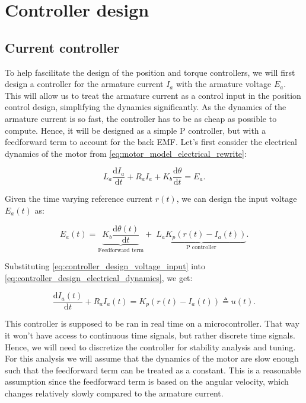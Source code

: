 \chapter{Controller design}%
\label{ch:controller_design}

\section{Current controller}

To help fascilitate the design of the position and torque controllers, we will first design a controller for the armature current $I_a$ with the armature voltage $E_a$. This will allow us to treat the armature current as a control input in the position control design, simplifying the dynamics significantly. As the dynamics of the armature current is so fast, the controller has to be as cheap as possible to compute. Hence, it will be designed as a simple P controller, but with a feedforward term to account for the back EMF. Let's first consider the electrical dynamics of the motor from \cref{eq:motor_model_electrical_rewrite}:

\begin{equation}
    \label{eq:controller_design_electrical_dynamics}
    L_a \frac{\mathrm{d}I_a}{\mathrm{d}t} + R_a I_a + K_b \frac{\mathrm{d}\theta}{\mathrm{d}t}= E_a.
\end{equation}

Given the time varying reference current $r(t)$, we can design the input voltage $E_a(t)$ as:

\begin{equation}
    \label{eq:controller_design_voltage_input}
    E_a(t) = \underbrace{K_b \frac{\mathrm{d}\theta(t)}{\mathrm{d}t}}_{\text{Feedforward term}} + \;\underbrace{L_a K_p \left(r(t) - I_a(t)\right)}_{\text{P controller}}.
\end{equation}

Substituting \cref{eq:controller_design_voltage_input} into \cref{eq:controller_design_electrical_dynamics}, we get:

\begin{equation}
    \label{eq:controller_design_current_dynamics}
    \frac{\mathrm{d}I_a(t)}{\mathrm{d}t} + R_a I_a(t) = K_p (r(t) - I_a(t)) \triangleq u(t).
\end{equation}

This controller is supposed to be ran in real time on a microcontroller. That way it won't have access to continuous time signals, but rather discrete time signals. Hence, we will need to discretize the controller for stability analysis and tuning. For this analysis we will assume that the dynamics of the motor are slow enough such that the feedforward term can be treated as a constant. This is a reasonable assumption since the feedforward term is based on the angular velocity, which changes relatively slowly compared to the armature current.


